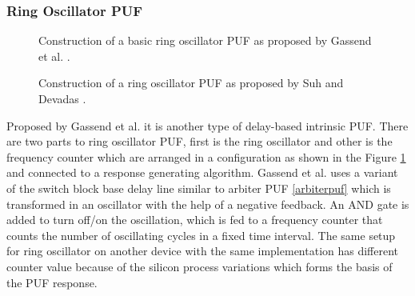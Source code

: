 \subsubsection{Ring Oscillator PUF}

\begin{figure}[t!]
\centering
{}
\caption{Construction of a basic ring oscillator PUF as proposed by Gassend et al. \cite{21,17}.}
\label{img:ring}
\end{figure}

\begin{figure}[h!]
\centering
{}
\caption{Construction of a ring oscillator PUF as proposed by Suh and Devadas \cite{8,17}.}
\label{img:ring_suh}
\end{figure}

Proposed by Gassend et al. \cite{21} it is another type of delay-based intrinsic PUF. There are two parts to ring oscillator PUF, first is the ring oscillator and other is the frequency counter which are arranged in a configuration as shown in the Figure \ref{img:ring} and connected to a response generating algorithm. Gassend et al. uses a variant of the switch block base delay line similar to arbiter PUF \ref{arbiterpuf} which is transformed in an oscillator with the help of a negative feedback.
An AND gate is added to turn off/on the oscillation, which is fed to a frequency counter that counts the number of oscillating cycles in a fixed time interval. The same setup for ring oscillator on another device with the same implementation has different counter value because of the silicon process variations which forms the basis of the PUF response.\\

